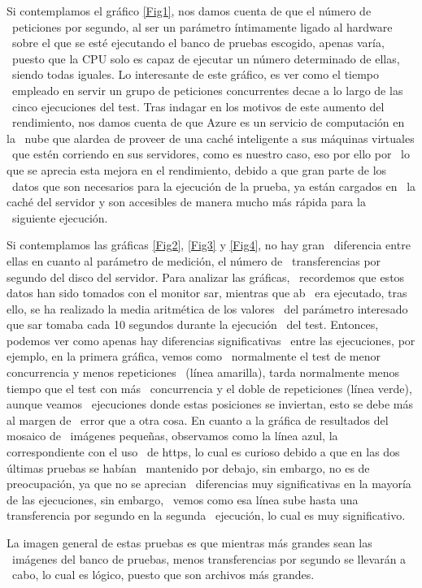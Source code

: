 \documentclass[11pt,twoside,a4paper]{book}
\begin{document}
Si contemplamos el gráfico \ref{Fig1}, nos damos cuenta de que el número de \
peticiones por segundo, al ser un parámetro íntimamente ligado al hardware \
sobre el que se esté ejecutando el banco de pruebas escogido, apenas varía, \
puesto que la CPU solo es capaz de ejecutar un número determinado de ellas, \
siendo todas iguales. Lo interesante de este gráfico, es ver como el tiempo \
empleado en servir un grupo de peticiones concurrentes decae a lo largo de las \
cinco ejecuciones del test. Tras indagar en los motivos de este aumento del \
rendimiento, nos damos cuenta de que Azure es un servicio de computación en la \
nube que alardea de proveer de una caché inteligente a sus máquinas virtuales \
que estén corriendo en sus servidores, como es nuestro caso, eso por ello por \
lo que se aprecia esta mejora en el rendimiento, debido a que gran parte de los \
datos que son necesarios para la ejecución de la prueba, ya están cargados en \
la caché del servidor y son accesibles de manera mucho más rápida para la \
siguiente ejecución.

Si contemplamos las gráficas \ref{Fig2}, \ref{Fig3} y \ref{Fig4}, no hay gran \
diferencia entre ellas en cuanto al parámetro de medición, el número de \
transferencias por segundo del disco del servidor. Para analizar las gráficas, \
recordemos que estos datos han sido tomados con el monitor sar, mientras que ab \
era ejecutado, tras ello, se ha realizado la media aritmética de los valores \
del parámetro interesado que sar tomaba cada 10 segundos durante la ejecución \
del test. Entonces, podemos ver como apenas hay diferencias significativas \
entre las ejecuciones, por ejemplo, en la primera gráfica, vemos como \
normalmente el test de menor concurrencia y menos repeticiones \
(línea amarilla), tarda normalmente menos tiempo que el test con más \
concurrencia y el doble de repeticiones (línea verde), aunque veamos \
ejecuciones donde estas posiciones se inviertan, esto se debe más al margen de \
error que a otra cosa. En cuanto a la gráfica de resultados del mosaico de \
imágenes pequeñas, observamos como la línea azul, la correspondiente con el uso \
de https, lo cual es curioso debido a que en las dos últimas pruebas se habían \
mantenido por debajo, sin embargo, no es de preocupación, ya que no se aprecian \
diferencias muy significativas en la mayoría de las ejecuciones, sin embargo, \
vemos como esa línea sube hasta una transferencia por segundo en la segunda \
ejecución, lo cual es muy significativo.

La imagen general de estas pruebas es que mientras más grandes sean las \
imágenes del banco de pruebas, menos transferencias por segundo se llevarán a \
cabo, lo cual es lógico, puesto que son archivos más grandes.
\end{document}
